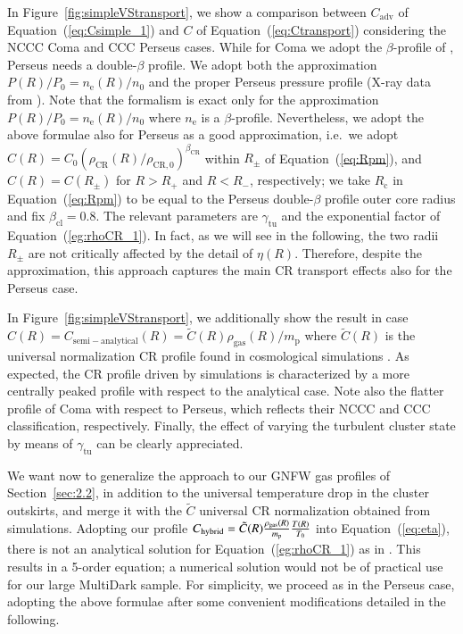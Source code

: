 \documentclass[traditabstract]{aa}
\newcommand{\rmn}{\mathrm}
\begin{document}
\begin{appendix}
In Figure~\ref{fig:simpleVStransport}, we show a comparison between $C_{\rmn{adv}}$ of 
Equation~(\ref{eq:Csimple_1}) and $C$ of Equation~(\ref{eq:Ctransport}) considering the 
NCCC Coma and CCC Perseus cases. While for Coma we adopt the $\beta$-profile of 
\citet{1992A&A...259L..31B}, Perseus needs a double-$\beta$ profile. We adopt both the 
approximation $P(R)/P_{0}=n_{\rmn{e}}(R)/n_{0}$ and the proper Perseus pressure profile 
(X-ray data from \citealp{2003ApJ...590..225C}). Note that the \cite{2011A&A...527A..99E} 
formalism is exact only for the approximation $P(R)/P_{0}=n_{\rmn{e}}(R)/n_{0}$ where $n_{\rmn{e}}$ 
is a $\beta$-profile. Nevertheless, we adopt the above formulae also for Perseus as a good approximation, 
i.e.~we adopt $C(R)=C_{0}(\rho_{\rmn{CR}}(R)/\rho_{\rmn{CR},0})^{\beta_{\rmn{CR}}}$
within $R_{\pm}$ of Equation~(\ref{eq:Rpm}), and $C(R) = C(R_{\pm})$ for $R > R_{+}$ 
and $R < R_{-}$, respectively; we take $R_{\rmn{c}}$ in Equation~(\ref{eq:Rpm}) to be equal to the Perseus 
double-$\beta$ profile outer core radius and fix $\beta_{\rmn{cl}}=0.8$. The relevant 
parameters are $\gamma_{\rmn{tu}}$ and the exponential factor of Equation~(\ref{eg:rhoCR_1}). 
In fact, as we will see in the following, the two radii $R_{\pm}$ are not critically affected 
by the detail of $\eta(R)$. Therefore, despite the approximation, this approach captures the 
main CR transport effects also for the Perseus case. 

In Figure~\ref{fig:simpleVStransport}, we additionally show the result in case 
$C(R)=C_{\rmn{semi-analytical}}(R)=\tilde{C}(R)\rho_{\rmn{\rmn{gas}}}(R)/m_{\rmn{p}}$ 
where $\tilde{C}(R)$ is the universal normalization CR profile found in cosmological 
simulations \citep{2010MNRAS.409..449P}. As expected, the CR profile driven by 
simulations is characterized by a more centrally peaked profile with respect to the 
analytical case. Note also the flatter profile of Coma with respect to Perseus, which 
reflects their NCCC and CCC classification, respectively. Finally, the effect of varying 
the turbulent cluster state by means of $\gamma_{\rmn{tu}}$ can be clearly appreciated.

We want now to generalize the \cite{2011A&A...527A..99E} approach to our GNFW 
gas profiles of Section~\ref{sec:2.2}, in addition to the universal temperature drop in
the cluster outskirts, and merge it with the $\tilde{C}$ universal CR normalization 
obtained from simulations. Adopting our profile 
$C_{\rm{hybrid}} = \tilde{C}(R) \frac{\rho_{\rmn{gas}}(R)}{m_\rmn{p}} \frac{T(R)}{T_0} $
into Equation~(\ref{eq:eta}), there is not an analytical solution for Equation~(\ref{eg:rhoCR_1}) 
as in \cite{2011A&A...527A..99E}. This results in a 5-order equation; a numerical 
solution would not be of practical use for our large MultiDark sample. For simplicity, we 
proceed as in the Perseus case, adopting the above formulae after some convenient 
modifications detailed in the following. 


\end{appendix}
\end{document}
